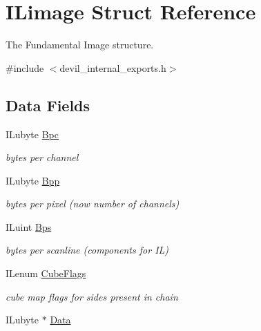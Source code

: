 \hypertarget{struct_i_limage}{\section{I\-Limage Struct Reference}
\label{struct_i_limage}
}


The Fundamental Image structure.  




{\ttfamily \#include $<$devil\-\_\-internal\-\_\-exports.\-h$>$}

\subsection*{Data Fields}
\begin{DoxyCompactItemize}
\item 
\hypertarget{struct_i_limage_a77cd917981bd92ddb76c5108db5993e8}{I\-Lubyte \hyperlink{struct_i_limage_a77cd917981bd92ddb76c5108db5993e8}{Bpc}}\label{struct_i_limage_a77cd917981bd92ddb76c5108db5993e8}

\begin{DoxyCompactList}\small\item\em bytes per channel \end{DoxyCompactList}\item 
\hypertarget{struct_i_limage_acb619433784a0e26c0f1f18b3700c9f7}{I\-Lubyte \hyperlink{struct_i_limage_acb619433784a0e26c0f1f18b3700c9f7}{Bpp}}\label{struct_i_limage_acb619433784a0e26c0f1f18b3700c9f7}

\begin{DoxyCompactList}\small\item\em bytes per pixel (now number of channels) \end{DoxyCompactList}\item 
\hypertarget{struct_i_limage_a014c9fe6e8ca1f1343288fd3be38249f}{I\-Luint \hyperlink{struct_i_limage_a014c9fe6e8ca1f1343288fd3be38249f}{Bps}}\label{struct_i_limage_a014c9fe6e8ca1f1343288fd3be38249f}

\begin{DoxyCompactList}\small\item\em bytes per scanline (components for I\-L) \end{DoxyCompactList}\item 
\hypertarget{struct_i_limage_a2141dcf3ce36303a8c31d417d9337034}{I\-Lenum \hyperlink{struct_i_limage_a2141dcf3ce36303a8c31d417d9337034}{Cube\-Flags}}\label{struct_i_limage_a2141dcf3ce36303a8c31d417d9337034}

\begin{DoxyCompactList}\small\item\em cube map flags for sides present in chain \end{DoxyCompactList}\item 
\hypertarget{struct_i_limage_a32fd28ac5d89e3ef2f9151330af0149d}{I\-Lubyte $\ast$ \hyperlink{struct_i_limage_a32fd28ac5d89e3ef2f9151330af0149d}{Data}}\label{struct_i_limage_a32fd28ac5d89e3ef2f9151330af0149d}


\end{DoxyCompactItemize}
